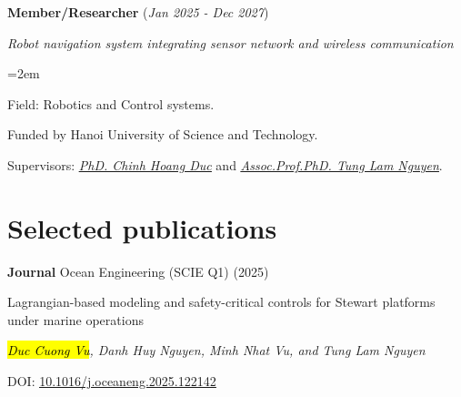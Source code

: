 \documentclass[10pt]{article}
\let\oldhref\href
\renewcommand{\href}[2]{\oldhref{#1}{\ul{#2}}}
\newlength{\skilllabelwidth}
\newcommand{\skill}[2]{%
	\noindent
	\parbox[t]{\skilllabelwidth}{\raggedright\textbf{#1}}%
	\hspace{0.5em}%
	\parbox[t]{\dimexpr\linewidth-\skilllabelwidth-0.5em\relax}{%
		\hangindent=0pt\hangafter=0 #2%
	}\par\vspace{0.15cm}
}
\newcommand{\project}[4]{%
	\noindent \textbf{#1} (\textit{#2})\par
	\vspace{0.5em}
	\noindent \textit{#3}\par
	\vspace{0.5em}
	\noindent\hangindent=2em\hangafter=0 #4 \par\normalsize
}
\newcommand{\publication}[5]{%
	\noindent \textbf{#1} \hspace{0.1cm} #2 \par
	\vspace{0.5em}
	\noindent #3 \par
	\vspace{0.5em}
	\noindent \textit{#4} \par
	\vspace{0.5em}
	\noindent DOI: \href{https://doi.org/#5}{#5} \par
}
\begin{document}
		\project{Member/Researcher}{Jan 2025 - Dec 2027}{Robot navigation system integrating sensor network and wireless communication}
		{\begin{soloitemize}
				\item Field: Robotics and Control systems.
				\item Funded by Hanoi University of Science and Technology.
				\item Supervisors: \href{https://scholar.google.com/citations?user=mI561CkAAAAJ&hl=en}{\textit{PhD. Chinh Hoang Duc}} 
				and 
				\href{https://scholar.google.com/citations?user=MlJ_2-wAAAAJ&hl=en}{\textit{Assoc.Prof.PhD. Tung Lam Nguyen}}.
		\end{soloitemize}
		}

	
%	
%	
%	
%	
%	
%	
	
	
	
	
	\section*{Selected publications}
	\publication{Journal}
	{Ocean Engineering (SCIE Q1) (2025)}
	{Lagrangian-based modeling and safety-critical controls for Stewart platforms under marine operations}
	{\hl{Duc Cuong Vu}, Danh Huy Nguyen, Minh Nhat Vu, and Tung Lam Nguyen}
	{10.1016/j.oceaneng.2025.122142}
	
\end{document}
